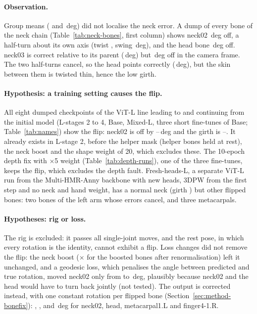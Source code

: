\paragraph{Observation.} Group means (\DiagGroupMeanNeck{} and \DiagGroupMeanHead\,deg) did not localise the neck
error. A dump of every bone of the neck chain
(Table~\ref{tab:neck-bones}, first column) shows neck02 \DiagDumpNeckTwo\,deg off, a half-turn about its own axis
(twist \DiagDumpNeckTwoTwist, swing \DiagDumpNeckTwoSwing\,deg), and the head bone \DiagDumpHead\,deg off. neck03 is
correct relative to its parent (\DiagDumpNeckThree\,deg) but \DiagDumpNeckThreeGlobal\,deg off in the camera frame.
The two half-turns cancel, so the head points correctly (\DiagDumpHeadGlobal\,deg), but the skin between them is
twisted thin, hence the low girth.

\paragraph{Hypothesis: a training setting causes the flip.} All eight dumped checkpoints of the ViT-L line leading to
and continuing from the initial model (L-stages 2 to 4, Base, Mixed-L, three short fine-tunes of Base;
Table~\ref{tab:names}) show the flip: neck02 is off by
\DiagNeckTwoRangeLow--\DiagNeckTwoRangeHigh\,deg and the girth is \DiagGirthRangeLow--\DiagGirthRangeHigh. It already
exists in L-stage 2, before the helper mask (helper bones held at rest), the neck boost and the shape weight of 20,
which excludes these. The 10-epoch depth fix with $\times$5 weight
(Table~\ref{tab:depth-runs}), one of the three fine-tunes, keeps the flip, which excludes the depth fault.
Fresh-heads-L, a separate ViT-L run from the Multi-HMR-Anny backbone with new heads, 3DPW from the first step and no
neck and hand weight, has a normal neck (girth \DiagFreshGirth) but other flipped bones:
two bones of the left arm whose errors cancel, and three metacarpals.

\paragraph{Hypotheses: rig or loss.} The rig is excluded: it passes all \DiagPerturbations{} single-joint moves, and
the rest pose, in which every rotation is the identity, cannot exhibit a flip. Loss changes did not remove the flip:
the neck boost ($\times$\MethodBoostOn{} for the boosted bones after renormalisation) left it unchanged, and a
geodesic loss, which penalises the angle between predicted and true rotation, moved neck02 only from
\DiagNeckTwoBase{} to \DiagGeodesicNeckTwo\,deg, plausibly because neck02 and the head would have to turn back
jointly (not tested). The output is corrected instead, with one constant rotation per flipped bone
(Section~\ref{sec:method-bonefix}): \DiagCorrNeckTwo, \DiagCorrHead, \DiagCorrMetacarpal{} and \DiagCorrFinger\,deg
for neck02, head, metacarpal1.L and finger4-1.R.

